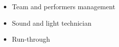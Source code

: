 \documentclass[10pt,a4paper]{../altacv}
\begin{document}
\divider

\begin{itemize}[leftmargin=7mm]
\item Team and performers management
\item Sound and light technician
\item Run-through
\end{itemize}






\end{document}
